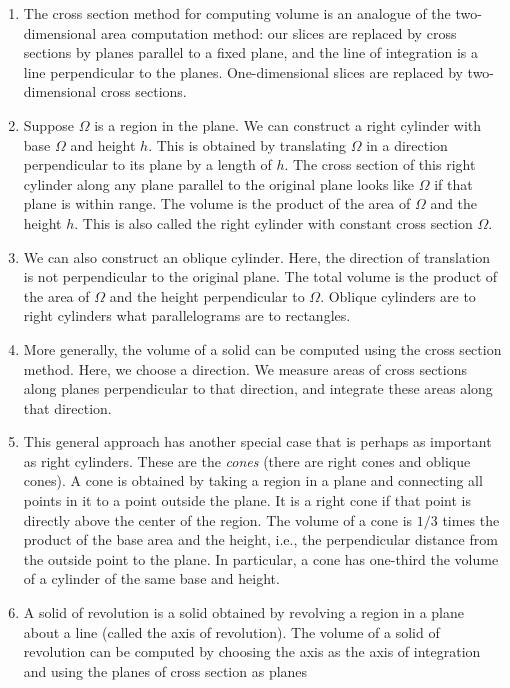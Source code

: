 \documentclass[10pt]{amsart}
\begin{document}
\begin{enumerate}
\item The cross section method for computing volume is an analogue of
  the two-dimensional area computation method: our slices are replaced
  by cross sections by planes parallel to a fixed plane, and the line
  of integration is a line perpendicular to the
  planes. One-dimensional slices are replaced by two-dimensional cross
  sections.
\item Suppose $\Omega$ is a region in the plane. We can construct a
  right cylinder with base $\Omega$ and height $h$. This is obtained
  by translating $\Omega$ in a direction perpendicular to its plane by
  a length of $h$. The cross section of this right cylinder along any
  plane parallel to the original plane looks like $\Omega$ if that
  plane is within range. The volume is the product of the area of
  $\Omega$ and the height $h$. This is also called the right cylinder
  with constant cross section $\Omega$.
\item We can also construct an oblique cylinder. Here, the direction
  of translation is not perpendicular to the original plane. The total
  volume is the product of the area of $\Omega$ and the height
  perpendicular to $\Omega$. Oblique cylinders are to right cylinders
  what parallelograms are to rectangles.
\item More generally, the volume of a solid can be computed using the
  cross section method. Here, we choose a direction. We measure areas
  of cross sections along planes perpendicular to that direction, and
  integrate these areas along that direction.
\item This general approach has another special case that is perhaps
  as important as right cylinders. These are the {\em cones} (there
  are right cones and oblique cones). A cone is obtained by taking a
  region in a plane and connecting all points in it to a point outside
  the plane. It is a right cone if that point is directly above the
  center of the region. The volume of a cone is $1/3$ times the
  product of the base area and the height, i.e., the perpendicular
  distance from the outside point to the plane. In particular, a cone
  has one-third the volume of a cylinder of the same base and height.
\item A solid of revolution is a solid obtained by revolving a region
  in a plane about a line (called the axis of revolution). The volume
  of a solid of revolution can be computed by choosing the axis as the
  axis of integration and using the planes of cross section as planes

\end{enumerate}
\end{document}
